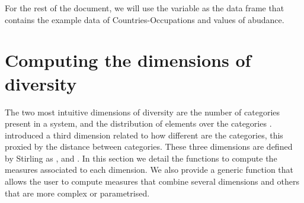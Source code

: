 

For the rest of the document, we will use the variable  as the data frame that contains the example data of Countries-Occupations and values of abudance.




\section{Computing the dimensions of diversity}
The two most intuitive dimensions of diversity are the number of categories present in a system, and the distribution of elements over the categories \citep{mcdonald_conceptualization_2003}. 
\citet{stirling_general_2007} introduced a third dimension related to how different are the categories, this proxied by the distance between categories. 
These three dimensions are defined by Stirling as ,  and . 
In this section we detail the functions to compute the measures associated to each dimension. We also provide a generic function that allows the user to compute measures that combine several dimensions and others that are more complex or parametrised.

